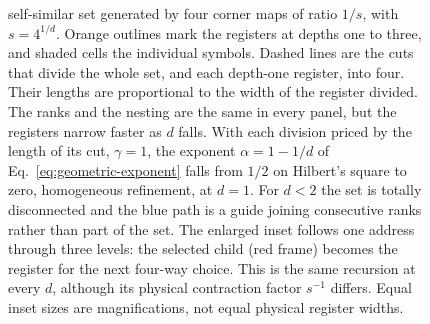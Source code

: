 \begin{figure}[t]
{    self-similar set generated by four corner maps of ratio $1/s$, with
    $s=4^{1/d}$. Orange outlines mark the registers at depths one to
    three, and shaded cells the individual symbols. Dashed lines are the
    cuts that divide the whole set, and each depth-one register, into
    four. Their lengths are proportional to the width of the register
    divided. The ranks and the nesting are the same in every panel, but
    the registers narrow faster as $d$ falls. With each division priced
    by the length of its cut, $\gamma=1$, the exponent $\alpha=1-1/d$ of
    Eq.~\eqref{eq:geometric-exponent} falls from $1/2$ on Hilbert's
    square to zero, homogeneous refinement, at $d=1$. For $d<2$ the set
    is totally disconnected and the blue path is a guide joining
    consecutive ranks rather than part of the set. The enlarged inset
    follows one address through three levels: the selected child
    (red frame) becomes the register for the next four-way choice.
    This is the same recursion at every $d$, although its physical
    contraction factor $s^{-1}$ differs. Equal inset sizes are
    magnifications, not equal physical register widths.}
  \label{fig:fractional-hilbert}
\end{figure}
